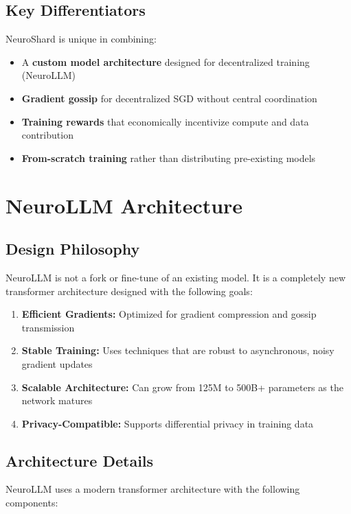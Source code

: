 \documentclass[11pt,a4paper]{article}
\begin{document}
\subsection{Key Differentiators}

NeuroShard is unique in combining:
\begin{itemize}
    \item A \textbf{custom model architecture} designed for decentralized training (NeuroLLM)
    \item \textbf{Gradient gossip} for decentralized SGD without central coordination
    \item \textbf{Training rewards} that economically incentivize compute and data contribution
    \item \textbf{From-scratch training} rather than distributing pre-existing models
\end{itemize}

\section{NeuroLLM Architecture}

\subsection{Design Philosophy}

NeuroLLM is not a fork or fine-tune of an existing model. It is a completely new transformer architecture designed with the following goals:

\begin{enumerate}
    \item \textbf{Efficient Gradients:} Optimized for gradient compression and gossip transmission
    \item \textbf{Stable Training:} Uses techniques that are robust to asynchronous, noisy gradient updates
    \item \textbf{Scalable Architecture:} Can grow from 125M to 500B+ parameters as the network matures
    \item \textbf{Privacy-Compatible:} Supports differential privacy in training data
\end{enumerate}

\subsection{Architecture Details}

NeuroLLM uses a modern transformer architecture with the following components:
\end{document}
